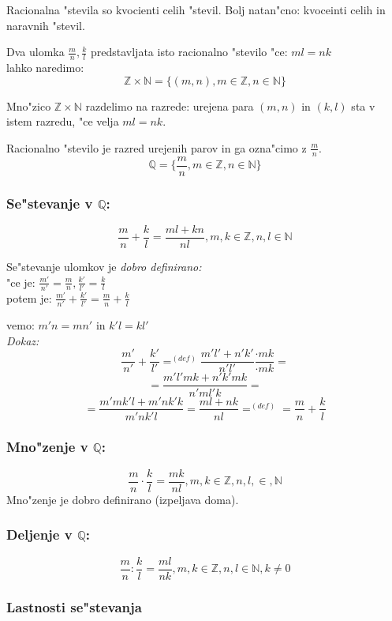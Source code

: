 Racionalna "stevila so kvocienti celih "stevil. Bolj natan"cno: kvoceinti celih in naravnih "stevil.

Dva ulomka \(\frac{m}{n}, \frac{k}{l} \) predstavljata isto racionalno "stevilo "ce: \(ml = nk \)\\
lahko naredimo:
\[\mathbb{Z} \times \mathbb{N} = \{(m, n), m \in \mathbb{Z}, n \in \mathbb{N} \}\]

Mno"zico \(\mathbb{Z} \times \mathbb{N} \) razdelimo na razrede: urejena para \((m, n)\) in \((k, l)\) sta v istem razredu, "ce velja \(ml = nk\).

Racionalno "stevilo je razred urejenih parov in ga ozna"cimo z \(\frac{m}{n}\).
\[\mathbb{Q} = \{\frac{m}{n}, m \in \mathbb{Z}, n \in \mathbb{N}\} \]

\subsubsection*{Se"stevanje v \(\mathbb{Q}\):}
\[\frac{m}{n} + \frac{k}{l} = \frac{ml + kn}{nl}, m, k \in \mathbb{Z}, n, l \in \mathbb{N} \]

Se"stevanje ulomkov je \emph{dobro definirano:}\\
"ce je: \(\frac{m'}{n'} = \frac{m}{n}, \frac{k'}{l'} = \frac{k}{l}\)\\
potem je: \(\frac{m'}{n'} + \frac{k'}{l'} = \frac{m}{n} + \frac{k}{l}\)

vemo: \(m'n = mn'\) in \(k'l = kl'\)\\
\emph{Dokaz:}
\[\frac{m'}{n'} + \frac{k'}{l'} =^{(def)} \frac{m'l' + n'k'}{n'l'} \frac{\cdot mk}{\cdot mk}=\]
\[= \frac{m'l'mk + n'k'mk}{n'ml'k} = \]
\[= \frac{m'mk'l + m'nk'k}{m'nk'l} = \frac{ml + nk}{nl} =^{(def)} = \frac{m}{n} + \frac{k}{l}\]

\subsubsection*{Mno"zenje v \(\mathbb{Q}\):}
\[\frac{m}{n} \cdot \frac{k}{l} = \frac{mk}{nl}, m, k \in \mathbb{Z}, n, l, \in, \mathbb{N}\]
Mno"zenje je dobro definirano (izpeljava doma).

\subsubsection*{Deljenje v \(\mathbb{Q}\):}
\[\frac{m}{n} : \frac{k}{l} = \frac{ml}{nk}, m, k \in \mathbb{Z}, n, l \in \mathbb{N}, k \neq 0 \]

\subsubsection*{Lastnosti se"stevanja}

